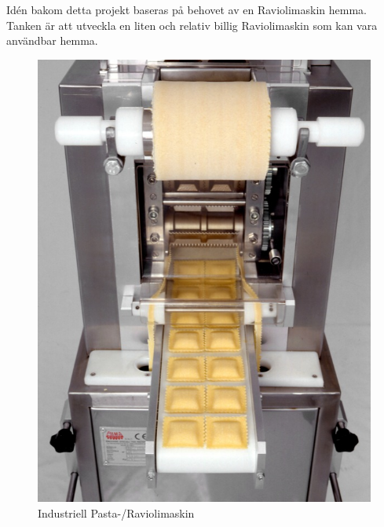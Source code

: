 Idén bakom detta projekt baseras på behovet av en Raviolimaskin hemma. Tanken är att utveckla en liten och relativ billig Raviolimaskin som kan vara användbar hemma.
 		\begin{figure}[h]
 			\begin{center}
 				\includegraphics[scale=3]{images/pastamachine.jpg}
 				\caption{Industriell Pasta-/Raviolimaskin~\cite{induRavioliMaskin}}
 				\label{pastamaskin}	
 			\end{center}
 		\end{figure} 